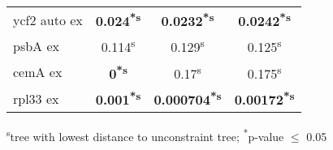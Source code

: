 \documentclass[a4paper]{article}
\begin{document}
\begin{longtable}{l|c|c|c}
ycf2 auto ex&\textbf{0.024\textsuperscript{*}\textsuperscript{s}}&\textbf{0.0232\textsuperscript{*}\textsuperscript{s}}&\textbf{0.0242\textsuperscript{*}\textsuperscript{s}}\\
psbA ex&0.114\textsuperscript{s}&0.129\textsuperscript{s}&0.125\textsuperscript{s}\\
cemA ex&\textbf{0\textsuperscript{*}\textsuperscript{s}}&0.17\textsuperscript{s}&0.175\textsuperscript{s}\\
rpl33 ex&\textbf{0.001\textsuperscript{*}\textsuperscript{s}}&\textbf{0.000704\textsuperscript{*}\textsuperscript{s}}&\textbf{0.00172\textsuperscript{*}\textsuperscript{s}}\\
\end{longtable}
\textsuperscript{s}tree with lowest distance to unconstraint tree; \textsuperscript{*}p-value $\leq$ 0.05
\end{document}
